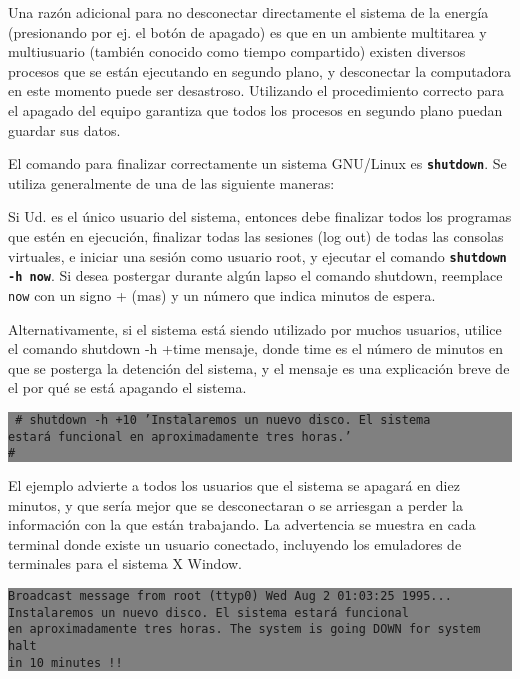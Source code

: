 \documentclass[12pt]{article}
\begin{document}
 Una razón adicional para no desconectar directamente el sistema de la
energía (presionando por ej. el botón de apagado) es que en un ambiente
multitarea y multiusuario (también conocido como tiempo compartido) existen 
diversos procesos que se están ejecutando en segundo plano, y
desconectar la computadora en este momento puede ser desastroso. Utilizando el
procedimiento correcto para el apagado del equipo garantiza que todos los
procesos en segundo plano puedan guardar sus datos.  

 El comando para finalizar correctamente un sistema GNU/Linux es
\texttt{\textbf{shutdown}}. Se utiliza generalmente de una de las 
siguiente maneras: 

 Si Ud. es el único usuario del sistema, entonces debe finalizar todos los
programas que estén en ejecución, finalizar todas las sesiones (log out) de
todas las consolas virtuales, e iniciar una sesión como usuario root, y 
ejecutar el comando \texttt{\textbf{shutdown -h now}}. Si
desea postergar durante algún lapso el comando shutdown, reemplace
\texttt{now} con un signo + (mas) y un número que indica minutos de
espera.  

 Alternativamente, si el sistema está siendo utilizado por muchos
usuarios, utilice el comando shutdown -h +time mensaje, donde time es el número
de minutos en que se posterga la detención del sistema, y el mensaje es una
explicación breve de el por qué se está apagando el sistema.

\colorbox{grey}{\parbox[t]{0.95\linewidth}{ \vspace*{0.5cm} 
{\tt
\# shutdown -h +10 'Instalaremos un nuevo disco. El sistema  \\
estará funcional en aproximadamente tres horas.' \\
\#
} \vspace*{0.5cm} } } 

El ejemplo advierte a todos los usuarios que el sistema se apagará en diez
minutos, y que sería mejor que se desconectaran o se arriesgan a perder la
información con la que están trabajando. La advertencia se muestra en cada
terminal donde existe un usuario conectado, incluyendo los emuladores de
terminales para el sistema X Window. 



\colorbox{grey}{\parbox[t]{0.95\linewidth}{ \vspace*{0.5cm} 
{\tt  Broadcast message from root (ttyp0) Wed Aug  2 01:03:25 1995... \\
Instalaremos un nuevo disco. El sistema estará funcional \\
en aproximadamente tres horas.  The system is going DOWN for system halt \\
in 10 minutes !!   } \vspace*{0.5cm} } } 
\end{document}
